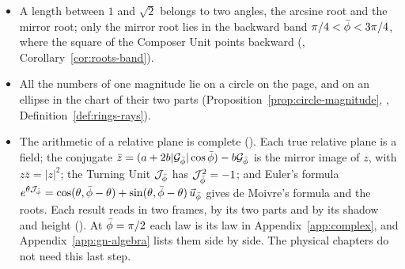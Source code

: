 \begin{plainwords}
\begin{itemize}
  \item A length between $1$ and $\sqrt{2}$ belongs to two angles, the arcsine root and the mirror root; only the mirror root lies in the backward band $\pi/4 < \bar{\phi} < 3\pi/4$, where the square of the Composer Unit points backward (, Corollary~\ref{cor:roots-band}).
  \item All the numbers of one magnitude lie on a circle on the page, and on an ellipse in the chart of their two parts (Proposition~\ref{prop:circle-magnitude}, , Definition~\ref{def:rings-rays}).
  \item The arithmetic of a relative plane is complete (). Each true relative plane is a field; the conjugate $\bar{z} = (a + 2b|\mathcal{G}_{\bar{\phi}}|\cos\bar{\phi}) - b\mathcal{G}_{\bar{\phi}}$ is the mirror image of $z$, with $z\bar{z} = |z|^2$; the Turning Unit $\mathcal{J}_{\bar{\phi}}$ has $\mathcal{J}_{\bar{\phi}}^2 = -1$; and Euler's formula $e^{\theta\mathcal{J}_{\bar{\phi}}} = \cos(\theta, \bar{\phi} - \theta) + \sin(\theta, \bar{\phi} - \theta)\,\vec{u}_{\bar{\phi}}$ gives de Moivre's formula and the roots. Each result reads in two frames, by its two parts and by its shadow and height (). At $\bar{\phi} = \pi/2$ each law is its law in Appendix~\ref{app:complex}, and Appendix~\ref{app:gn-algebra} lists them side by side. The physical chapters do not need this last step.
\end{itemize}
\end{plainwords}

